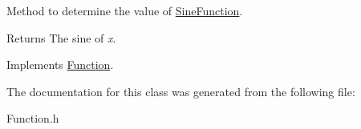 Method to determine the value of \hyperlink{class_sine_function}{Sine\+Function}. 

\begin{DoxyReturn}{Returns}
The sine of {\itshape x}. 
\end{DoxyReturn}


Implements \hyperlink{class_function_a7773feae8f1def0a2d7e479363700816}{Function}.



The documentation for this class was generated from the following file\+:\begin{DoxyCompactItemize}
\item 
Function.\+h\end{DoxyCompactItemize}
